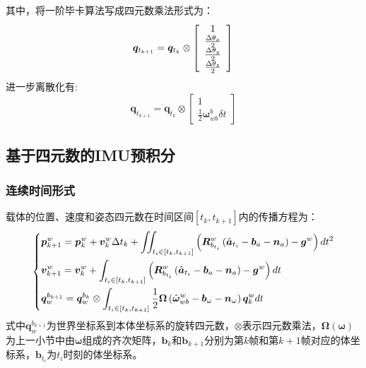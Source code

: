 其中，将一阶毕卡算法写成四元数乘法形式为：
\begin{equation}
	\bm{q}_{t_{k+1}}=\bm{q}_{t_k}\otimes\left[\begin{array}{c}
	1\\
	\frac{\Delta\theta_x}{2}\\
	\frac{\Delta\theta_y}{2}\\
	\frac{\Delta\theta_z}{2}
	\end{array}\right]\\
\end{equation}
进一步离散化有:
\begin{equation}
	\bm{q}_{t_{k+1}}=\bm{q}_{t_k}\otimes\left[\begin{array}{c}
	1\\
	\frac{1}{2}\bm{\omega}_{wb}^b\delta t
	\end{array}\right]
\end{equation}
\subsection{基于四元数的IMU预积分}
\subsubsection{连续时间形式}
载体的位置、速度和姿态四元数在时间区间$\left[t_k,t_{k+1}\right]$内的传播方程为：
\begin{equation}
\centering
\left\{
\begin{aligned}
&\bm{p}_{k+1}^w=\bm{p}_k^w+\bm{v}_k^w\Delta t_k+\iint_{t_i\in\left[t_k,t_{k+1}\right]}\left(\bm{R}_{b_{t_i}}^w\left(\hat{\bm{a}}_{t_i}-\bm{b}_a-\bm{n}_a\right)-\bm{g}^w\right)dt^2\\
&\bm{v}_{k+1}^w=\bm{v}_k^w+\int_{t_i\in\left[t_k,t_{k+1}\right]}\left(\bm{R}_{b_{t_i}}^w\left(\hat{\bm{a}}_{t_i}-\bm{b}_a-\bm{n}_a\right)-\bm{g}^w\right)dt\\
&\bm{q}_w^{b_{k+1}}=\bm{q}_w^{b_{k}}\otimes\int_{t_i\in\left[t_k,t_{k+1}\right]}\frac{1}{2}\bm{\Omega}\left(\hat{\bm{\omega}}_{wb}^w-\bm{b}_\omega-\bm{n}_\omega\right)\bm{q}_k^wdt
\end{aligned}
\right.
\label{eq.append.b.11}
\end{equation}
式中${\bm{q}_w^{b_{k+1}}}$为世界坐标系到本体坐标系的旋转四元数，$\otimes$表示四元数乘法，$\bm{\Omega}\left(\bm{\omega}\right)$为上一小节中由$\bm{\omega}$组成的齐次矩阵，$\bm{b}_k$和$\bm{b}_{k+1}$分别为第$k$帧和第$k+1$帧对应的体坐标系，$\bm{b}_{t_i}$为$t_i$时刻的体坐标系。

